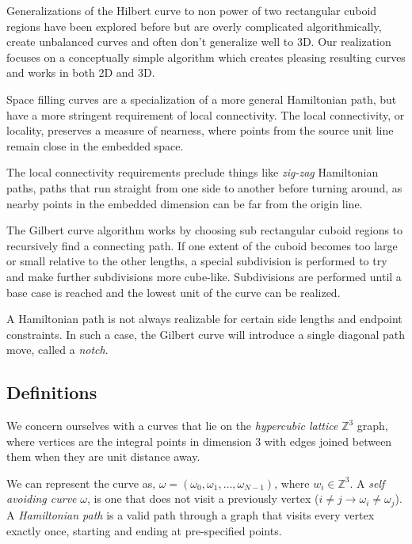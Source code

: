 Generalizations of the Hilbert curve to non power of two rectangular cuboid regions
have been explored before but are overly complicated algorithmically, create unbalanced
curves and often don't generalize well to 3D.
Our realization focuses on a conceptually simple algorithm which creates pleasing
resulting curves and works in both 2D and 3D.

Space filling curves are a specialization of a more general Hamiltonian path,
but have a more stringent requirement of local connectivity.
The local connectivity, or locality, preserves a measure of nearness, where
points from the source unit line remain close in the embedded space.

%
The local connectivity requirements
preclude things like \textit{zig-zag} Hamiltonian
paths, paths that run straight from one side to another before turning around,
as nearby points in the embedded dimension can be far from the origin line.



The Gilbert curve algorithm works by choosing sub rectangular cuboid regions
to recursively find a connecting path.
If one extent of the cuboid becomes too large or small relative to the other lengths,
a special subdivision is performed to try and make further subdivisions more cube-like.
Subdivisions are performed until a base case is reached and the lowest unit of the curve
can be realized.

A Hamiltonian path is not always realizable for certain side lengths and endpoint constraints.
In such a case, the Gilbert curve will introduce a single diagonal path move, called a \textit{notch}.


\subsection{Definitions}

We concern ourselves with a curves
that lie on the \textit{hypercubic lattice} $\mathbb{Z}^3$ graph,
where vertices are the integral points in dimension $3$ with edges joined between them when they
are unit distance away.

We can represent the curve as, $\omega = (\omega_0, \omega_1, \dots, \omega_{N-1})$, where $w_i \in \mathbb{Z}^3$.
A \textit{self avoiding curve} $\omega$, is one that does not visit a previously vertex ($i \ne j \to \omega_i \ne \omega_j$).
A \textit{Hamiltonian path} is a valid path through a graph that visits every vertex exactly once, starting
and ending at pre-specified points.

